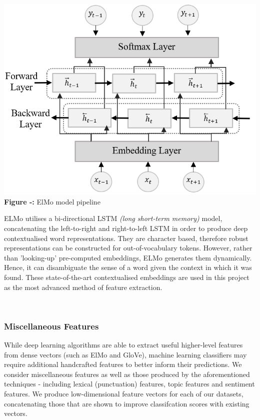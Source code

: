 \documentclass[12pt,a4paper]{article}
\begin{document}
\begin{minipage}{0.3\textwidth}
	 	\begin{center}
		\hspace{-1.5cm}\includegraphics[width=1.2\textwidth]{Images/elmo_diagram.png}\\
		\hspace{-1cm}\textbf{Figure -:} ElMo model pipeline\\
		\label{ElMo Model}
	\end{center}
\end{minipage} \hfill
\begin{minipage}{0.66\textwidth}
	  ELMo utilises a bi-directional LSTM \textit{(long short-term memory)} model, concatenating the left-to-right and right-to-left LSTM in order to produce deep contextualised word representations. They are character based, therefore robust representations can be constructed for out-of-vocabulary tokens. However, rather than 'looking-up' pre-computed embeddings, ELMo generates them dynamically. Hence, it can disambiguate the sense of a word given the context in which it was found. These state-of-the-art contextualised embeddings are used in this project as the most advanced method of feature extraction.
\end{minipage}\\

\subsubsection{Miscellaneous Features}
While deep learning algorithms are able to extract useful higher-level features from dense vectors (such as ElMo and GloVe), machine learning classifiers may require additional handcrafted features to better inform their predictions. We consider miscellaneous features as well as those produced by the aforementioned techniques - including lexical (punctuation) features, topic features and sentiment features. We produce low-dimensional feature vectors for each of our datasets, concatenating those that are shown to improve classifcation scores with existing vectors.\\\vspace{-5pt}
\end{document}
